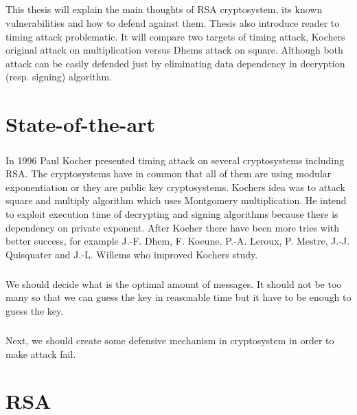 \documentclass[thesis=B,english]{FITthesis}[2012/10/20]
\begin{document}
\paragraph*{}
{This thesis will explain the main thoughts of RSA cryptosystem, its known vulnerabilities and how to defend against them. Thesis also introduce reader to timing attack problematic.
It will compare two targets of timing attack, Kochers original attack on multiplication versus Dhems attack on square. Although both attack can be easily defended just by eliminating
data dependency in decryption (resp. signing) algorithm.




\pagestyle{ruled}
\chapter{State-of-the-art}
\paragraph*{}{
In 1996 Paul Kocher presented timing attack on several cryptosystems including RSA\cite{Kocher1996}. The cryptosystems have in common that all of them are using modular exponentiation or they are public key cryptosystems. Kochers idea was to attack square and multiply algorithm which uses Montgomery multiplication. He intend to exploit execution time of decrypting and signing algorithms because there is dependency on private exponent. After Kocher there have been more tries with better success, for example J.-F. Dhem, F. Koeune, P.-A. Leroux, P. Mestre, J.-J. Quisquater and J.-L. Willems who improved Kochers study.\cite{Dhem}}


\paragraph*{}{
We should decide what is the optimal amount of messages. It should not be too many so that we can guess the key in reasonable time but it have to be enough to guess the key.
}
\paragraph*{}{
Next, we should create some defensive mechanism in cryptosystem in order to make attack fail.
}


\chapter{RSA}

}
\end{document}
